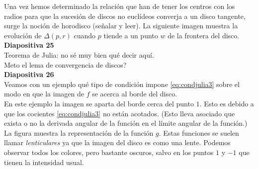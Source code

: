 \documentclass[spanish, a4paper, 12pt]{article}
\begin{document}
Una vez hemos determinado la relación que han de tener los centros con los radios para que la sucesión de discos no euclídeos converja a un disco tangente, surge la noción de horodisco (señalar y leer). La siguiente imagen muestra la evolución de $\Delta(p,r)$ cuando $p$ tiende a un punto $w$ de la frontera del disco. \\

\textbf{Diapositiva 25} \\

Teorema de Julia: no sé muy bien qué decir aquí. \\

Meto el lema de convergencia de discos? \\

\textbf{Diapositiva 26} \\

Veamos con un ejemplo qué tipo de condición impone \eqref{eq:condjulia3} sobre el modo en que la imagen de $f$ se acerca al borde del disco. \\

En este ejemplo la imagen se aparta del borde cerca del punto $1$. Esto es debido a que los cocientes \eqref{eq:condjulia3} no están acotados. (Esto lleva asociado que exista o no la derivada angular de la función en el límite angular de la función.) \\

    La figura muestra la representación de la función $g$. Estas funciones se suelen llamar \textit{lenticulares} ya que la imagen del disco es como una lente. Podemos observar todos los colores, pero bastante oscuros, salvo en los puntos $1$ y $-1$ que tienen la intensidad usual. \\
\end{document}
